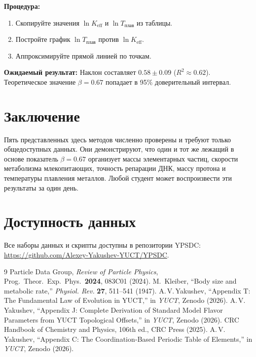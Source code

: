 \documentclass[12pt,a4paper]{article}
\newcommand{\Ke}{K_{\mathrm{eff}}}
\begin{document}
	\textbf{Процедура:}
	\begin{enumerate}[label=(\arabic*)]
		\item Скопируйте значения \(\ln \Ke\) и \(\ln T_{\text{плав}}\) из таблицы.
		\item Постройте график \(\ln T_{\text{плав}}\) против \(\ln \Ke\).
		\item Аппроксимируйте прямой линией по точкам.
	\end{enumerate}
	
	\textbf{Ожидаемый результат:} Наклон составляет \(0.58 \pm 0.09\) (\(R^2 \approx 0.62\)).
	Теоретическое значение \(\beta = 0.67\) попадает в 95\% доверительный интервал.
	
	\section{Заключение}
	
	Пять представленных здесь методов численно проверены и требуют только общедоступных данных.
	Они демонстрируют, что один и тот же лежащий в основе показатель \(\beta = 0.67\) организует
	массы элементарных частиц, скорости метаболизма млекопитающих, точность репарации ДНК,
	массу протона и температуры плавления металлов. Любой студент может воспроизвести эти
	результаты за один день.
	
	\section*{Доступность данных}
	Все наборы данных и скрипты доступны в репозитории YPSDC:\\
	\url{https://github.com/Alexey-Yakushev-YUCT/YPSDC}.
	
	\begin{thebibliography}{9}
		 Particle Data Group, \emph{Review of Particle Physics},
		Prog.\ Theor.\ Exp.\ Phys.\ \textbf{2024}, 083C01 (2024).
		 M.~Kleiber, ``Body size and metabolic rate,''
		\emph{Physiol. Rev.} \textbf{27}, 511--541 (1947).
		 A.\,V.\,Yakushev, ``Appendix T: The Fundamental Law
		of Evolution in YUCT,'' in \emph{YUCT}, Zenodo (2026).
		 A.\,V.\,Yakushev, ``Appendix J: Complete Derivation of
		Standard Model Flavor Parameters from YUCT Topological
		Offsets,'' in \emph{YUCT}, Zenodo (2026).
		 CRC Handbook of Chemistry and Physics, 106th ed.,
		CRC Press (2025).
		 A.\,V.\,Yakushev, ``Appendix C: The Coordination‑Based
		Periodic Table of Elements,'' in \emph{YUCT}, Zenodo (2026).
	\end{thebibliography}
	
\end{document}
